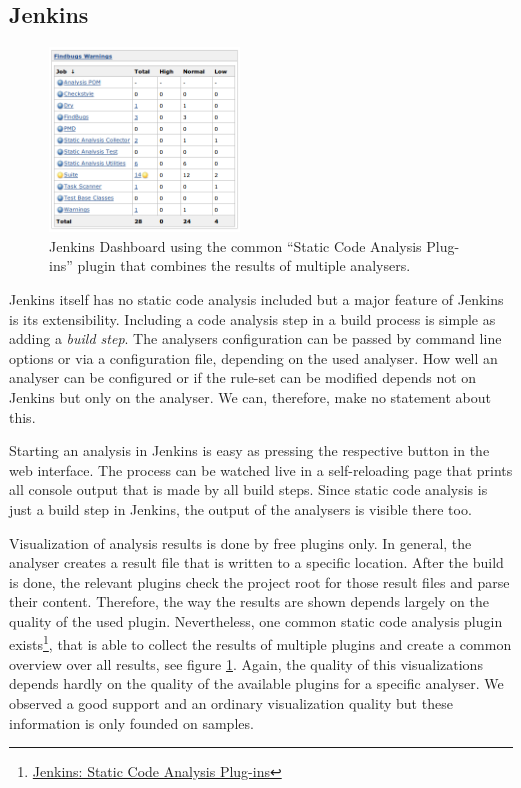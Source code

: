 \documentclass[conference]{IEEEtran}
\begin{document}
\subsection{Jenkins}
\label{subsec:evaluation_jenkins}

\begin{figure}[t]
	\centering
	\includegraphics[width=0.45\textwidth]{img/jenkins_dashboard.png}
	\caption{Jenkins Dashboard using the common ``Static Code Analysis Plug-ins'' plugin that combines the results of multiple analysers.}
	\label{fig:jenkins-dashboard}
\end{figure}

Jenkins itself has no static code analysis included but a major feature of Jenkins is its extensibility. Including a code analysis step in a build process is simple as adding a \textit{build step}. The analysers configuration can be passed by command line options or via a configuration file, depending on the used analyser. How well an analyser can be configured or if the rule-set can be modified depends not on Jenkins but only on the analyser. We can, therefore, make no statement about this.

Starting an analysis in Jenkins is easy as pressing the respective button in the web interface. The process can be watched live in a self-reloading page that prints all console output that is made by all build steps. Since static code analysis is just a build step in Jenkins, the output of the analysers is visible there too.

Visualization of analysis results is done by free plugins only. In general, the analyser creates a result file that is written to a specific location. After the build is done, the relevant plugins check the project root for those result files and parse their content. Therefore, the way the results are shown depends largely on the quality of the used plugin. Nevertheless, one common static code analysis plugin exists\footnote{\href{https://wiki.jenkins-ci.org/display/JENKINS/Static+Code+Analysis+Plug-ins}{Jenkins: Static Code Analysis Plug-ins}}, that is able to collect the results of multiple plugins and create a common overview over all results, see figure \ref{fig:jenkins-dashboard}. Again, the quality of this visualizations depends hardly on the quality of the available plugins for a specific analyser. We observed a good support and an ordinary visualization quality but these information is only founded on samples.
\end{document}
